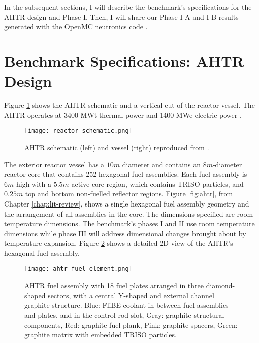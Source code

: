 In the subsequent sections, I will describe the benchmark's specifications for 
the \gls{AHTR} design and Phase I. Then, I will share our Phase I-A and I-B 
results generated with the OpenMC neutronics code \cite{romano_openmc_2013}. 

\section{Benchmark Specifications: AHTR Design}
Figure \ref{fig:reactor-schematic} shows the \acrfull{AHTR} schematic and a vertical 
cut of the reactor vessel. 
The \gls{AHTR} operates at 3400 MWt thermal power and 1400 MWe 
electric power \cite{varma_ahtr_2012}. 
\begin{figure}[]
    \centering
    \texttt{[image: reactor-schematic.png]} 
    \caption{\acrlong{AHTR} schematic (left) and vessel (right) reproduced from
    \cite{noauthor_fluoride_nodate}.}
    \label{fig:reactor-schematic}
\end{figure}
The exterior reactor vessel has a $10m$ diameter and contains an $8m$-diameter 
reactor core that contains 252 hexagonal fuel assemblies.
Each fuel assembly is $6m$ high with a $5.5m$ active core region, which contains
\gls{TRISO} particles, and $0.25m$ top and bottom non-fuelled reflector regions.
Figure \ref{fig:ahtr}, from Chapter \ref{chap:lit-review}, shows a single 
hexagonal fuel assembly geometry and the arrangement of all assemblies in the core.
The dimensions specified are room temperature dimensions. 
The benchmark's phases I and II use room temperature dimensions while phase III 
will address dimensional changes brought about by temperature expansion. 
Figure \ref{fig:ahtr-fuel-assembly} shows a detailed 2D view of the 
\gls{AHTR}'s hexagonal fuel assembly. 
\begin{figure}[]
    \centering
    \texttt{[image: ahtr-fuel-element.png]} 
    \caption{\acrlong{AHTR} fuel assembly with 18 fuel plates arranged in 
    three diamond-shaped sectors, with a central Y-shaped and external channel 
    graphite structure. Blue: FliBE coolant in between fuel assemblies and plates, 
    and in the control rod slot, Gray: graphite structural components, 
    Red: graphite fuel plank, Pink: graphite spacers, Green: graphite matrix 
    with embedded TRISO particles.}
    \label{fig:ahtr-fuel-assembly}
\end{figure}

